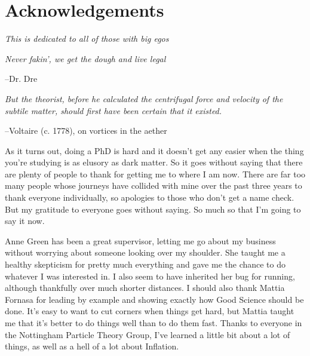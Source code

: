 \chapter*{Acknowledgements}

\begin{center}
\textit{This is dedicated to all of those with big egos}

\textit{Never fakin', we get the dough and live legal}
\end{center}
\begin{flushright}
  --Dr. Dre
\end{flushright}

\begin{center}
\textit{But the theorist, before he calculated the centrifugal force and velocity of the subtile matter, should first have been certain that it existed.}
\end{center}
\begin{flushright}
  --Voltaire (c. 1778), on vortices in the aether
\end{flushright}




As it turns out, doing a PhD is hard and it doesn't get any easier when the thing you're studying is as elusory as dark matter. So it goes without saying that there are plenty of people to thank for getting me to where I am now. There are far too many people whose journeys have collided with mine over the past three years to thank everyone individually, so apologies to those who don't get a name check. But my gratitude to everyone goes without saying. So much so that I'm going to say it now.

Anne Green has been a great supervisor, letting me go about my business without worrying about someone looking over my shoulder. She taught me a healthy skepticism for pretty much everything and gave me the chance to do whatever I was interested in. I also seem to have inherited her bug for running, although thankfully over much shorter distances. I should also thank Mattia Fornasa for leading by example and showing exactly how Good Science should be done. It's easy to want to cut corners when things get hard, but Mattia taught me that it's better to do things well than to do them fast. Thanks to everyone in the Nottingham Particle Theory Group, I've learned a little bit about a lot of things, as well as a hell of a lot about Inflation.

